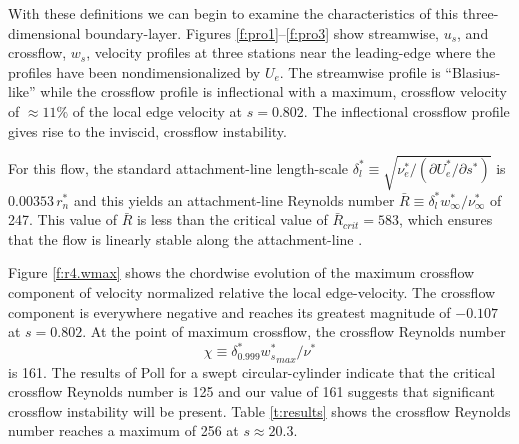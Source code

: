 With these definitions we can begin to examine the characteristics of this
three-dimensional boundary-layer.  Figures \ref{f:pro1}--\ref{f:pro3} show
streamwise, $u_s$, and crossflow, $w_s$, velocity profiles at three stations
near the leading-edge where the profiles have been nondimensionalized by
$U_e$.  The streamwise profile is ``Blasius-like'' while the crossflow profile
is inflectional with a maximum, crossflow velocity of $\approx 11\%$ of the
local edge velocity at $s=0.802$. The inflectional crossflow profile gives
rise to the inviscid, crossflow instability.

For this flow, the standard attachment-line length-scale $\delta^*_l \equiv
\sqrt{\nu_e^* / (\partial U^*_e / \partial s^*)}$ is $0.00353 \, r^*_n$ and
this yields an attachment-line Reynolds number $\bar R \equiv \delta^*_l
w^*_\infty / \nu^*_\infty$ of 247.  This value of $\bar R$ is less than the
critical value of $\bar R_{crit} = 583$, which ensures that the flow is
linearly stable along the attachment-line \cite{Spalart:89}.

Figure \ref{f:r4.wmax} shows the chordwise evolution of the maximum crossflow
component of velocity normalized relative the local edge-velocity.  The
crossflow component is everywhere negative and reaches its greatest magnitude
of $-0.107$ at $s=0.802$.  At the point of maximum crossflow, the crossflow
Reynolds number
%
\begin{equation} \label{e:chi}
  \chi \equiv \delta^*_{0.999} {w_s^*}_{max} / \nu^*
\end{equation}
%
is 161.  The results of Poll \cite{Poll:85} for a swept circular-cylinder
indicate that the critical crossflow Reynolds number is 125 and our value of
161 suggests that significant crossflow instability will be present.  Table
\ref{t:results} shows the crossflow Reynolds number reaches a maximum of 256
at $s \approx 20.3$.

